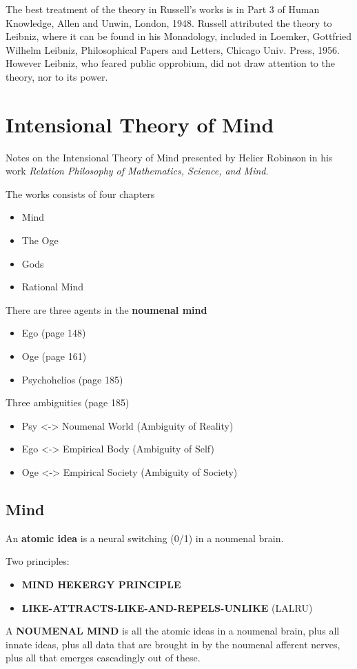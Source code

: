 \documentclass[11pt]{article}
\begin{document}
The best treatment of the theory in Russell's works is in Part 3 of Human Knowledge, Allen and Unwin, London, 1948. Russell attributed the theory to Leibniz, where it can be found in his Monadology, included in Loemker, Gottfried Wilhelm Leibniz, Philosophical Papers and Letters, Chicago Univ. Press, 1956. However Leibniz, who feared public opprobium, did not draw attention to the theory, nor to its power.


\section{Intensional Theory of Mind}
\label{sec-2}

Notes on the Intensional Theory of Mind presented by Helier Robinson in his 
work \emph{Relation Philosophy of Mathematics, Science, and Mind}.

The works consists of four chapters
\begin{itemize}
\item Mind
\item The Oge
\item Gods
\item Rational Mind
\end{itemize}
There are three agents in the \textbf{noumenal mind}
\begin{itemize}
\item Ego (page 148)
\item Oge (page 161)
\item Psychohelios (page 185)
\end{itemize}
Three ambiguities (page 185)
\begin{itemize}
\item Psy <-> Noumenal World (Ambiguity of Reality)
\item Ego <-> Empirical Body (Ambiguity of Self)
\item Oge <-> Empirical Society (Ambiguity of Society)
\end{itemize}
\subsection{Mind}
\label{sec-2.1}

An \textbf{atomic idea} is a neural switching (0/1) in a noumenal brain.

Two principles:
\begin{itemize}
\item \textbf{MIND HEKERGY PRINCIPLE}
\item \textbf{LIKE-ATTRACTS-LIKE-AND-REPELS-UNLIKE} (LALRU)
\end{itemize}
A \textbf{NOUMENAL MIND} is all the atomic ideas in a noumenal brain,
plus all innate ideas, plus all data that are brought in by
the noumenal afferent nerves, plus all that emerges cascadingly
out of these.
\end{document}

